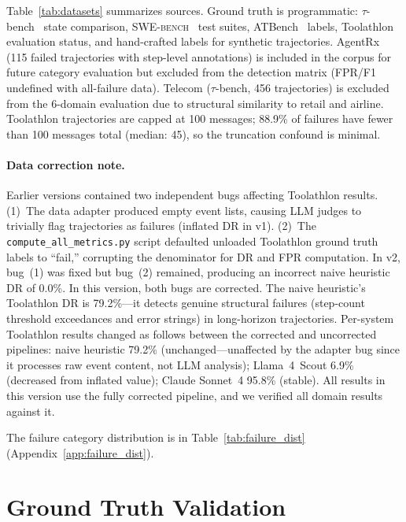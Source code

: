 \documentclass[11pt]{article}
\newcommand{\taubench}{$\tau$-bench\xspace}
\newcommand{\swebench}{\textsc{SWE-bench}\xspace}
\begin{document}
Table~\ref{tab:datasets} summarizes sources. Ground truth is programmatic:
\taubench~\citep{yao2025taubench} state comparison, \swebench~\citep{jimenez2024swebench}
test suites, ATBench~\citep{ai45research2025atbench} labels,
Toolathlon~\citep{toolathlon2026} evaluation status, and hand-crafted
labels for synthetic trajectories.
AgentRx~\citep{agentrx2026} (115 failed trajectories with step-level
annotations) is included in the corpus for future category evaluation
but excluded from the detection matrix (FPR/F1 undefined with all-failure
data). Telecom (\taubench, 456 trajectories) is excluded from the
6-domain evaluation due to structural similarity to retail and airline.
Toolathlon trajectories are capped at 100 messages; 88.9\% of failures
have fewer than 100 messages total (median: 45), so the truncation
confound is minimal.

\paragraph{Data correction note.}
Earlier versions contained two independent bugs affecting Toolathlon
results. (1)~The data adapter produced empty event lists, causing LLM
judges to trivially flag trajectories as failures (inflated DR in v1).
(2)~The \texttt{compute\_all\_metrics.py} script defaulted unloaded
Toolathlon ground truth labels to ``fail,'' corrupting the denominator
for DR and FPR computation. In v2, bug~(1) was fixed but bug~(2) remained,
producing an incorrect naive heuristic DR of 0.0\%. In this version, both
bugs are corrected. The naive heuristic's Toolathlon DR is 79.2\%---it
detects genuine structural failures (step-count threshold exceedances and
error strings) in long-horizon trajectories. Per-system Toolathlon results
changed as follows between the corrected and uncorrected pipelines: naive
heuristic 79.2\% (unchanged---unaffected by the adapter bug since it
processes raw event content, not LLM analysis); Llama~4~Scout 6.9\%
(decreased from inflated value); Claude Sonnet~4 95.8\% (stable).
All results in this version use the fully corrected pipeline, and we
verified all domain results against it.

The failure category distribution is in
Table~\ref{tab:failure_dist} (Appendix~\ref{app:failure_dist}).

\section{Ground Truth Validation}
\label{sec:ground_truth}
\end{document}
